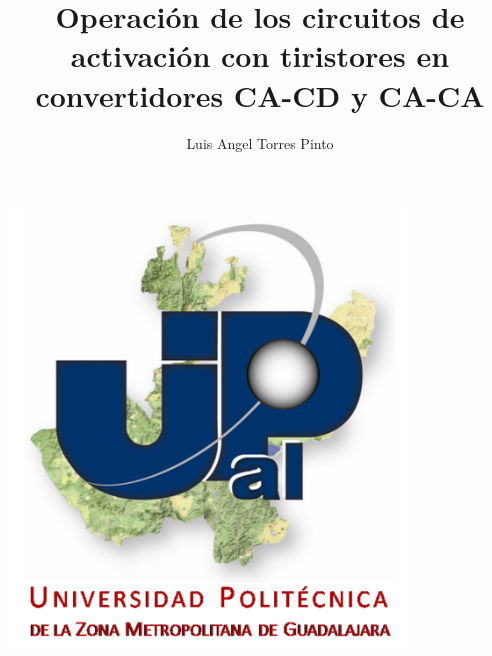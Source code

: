 \documentclass[12pt,a4paper]{article}
\author{Luis Angel Torres Pinto }
\title{Operación de los circuitos de activación con tiristores  en convertidores CA-CD y CA-CA}
\begin{document}
\maketitle
\centering
\includegraphics[width=0.8\textwidth]{upzmg.jpg} 

\newpage
\raggedright
\end{document}
